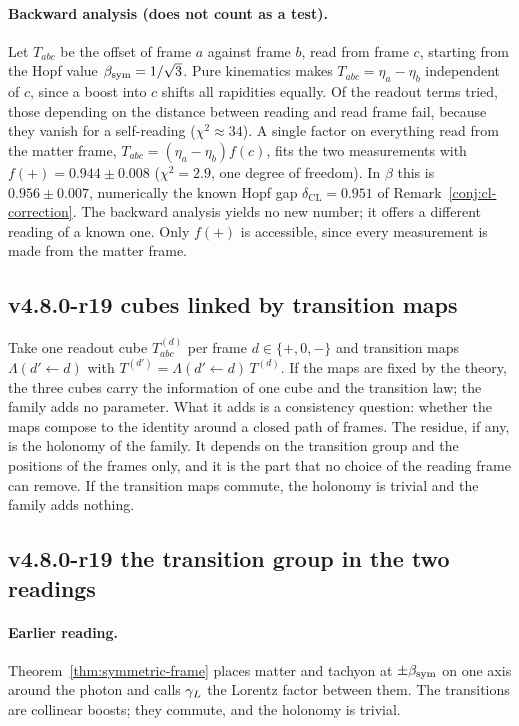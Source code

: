\paragraph{Backward analysis (does not count as a test).}
Let \(T_{abc}\) be the offset of frame \(a\) against frame \(b\), read from frame \(c\), starting from the Hopf value
\(\beta_{\mathrm{sym}}=1/\sqrt3\).  Pure kinematics makes \(T_{abc}=\eta_a-\eta_b\) independent of \(c\), since a boost into \(c\)
shifts all rapidities equally.  Of the readout terms tried, those depending on the distance between reading and read
frame fail, because they vanish for a self-reading (\(\chi^2\approx34\)).  A single factor on everything read from
the matter frame, \(T_{abc}=(\eta_a-\eta_b)f(c)\), fits the two measurements with \(f(+)=0.944\pm0.008\)
(\(\chi^2=2.9\), one degree of freedom).  In \(\beta\) this is \(0.956\pm0.007\), numerically the known Hopf gap
\(\delta_{\mathrm{CL}}=0.951\) of Remark~\ref{conj:cl-correction}.  The backward analysis yields no new number; it
offers a different reading of a known one.  Only \(f(+)\) is accessible, since every measurement is made from the
matter frame.

\subsection*{v4.8.0-r19 cubes linked by transition maps}
\label{subsec:v480-r19-cubes}

Take one readout cube \(T^{(d)}_{abc}\) per frame \(d\in\{+,0,-\}\) and transition maps
\(\Lambda(d'\!\leftarrow\!d)\) with \(T^{(d')}=\Lambda(d'\!\leftarrow\!d)\,T^{(d)}\).  If the maps are fixed by the
theory, the three cubes carry the information of one cube and the transition law; the family adds no parameter.
What it adds is a consistency question: whether the maps compose to the identity around a closed path of frames.  The
residue, if any, is the holonomy of the family.  It depends on the transition group and the positions of the frames
only, and it is the part that no choice of the reading frame can remove.  If the transition maps commute, the
holonomy is trivial and the family adds nothing.

\subsection*{v4.8.0-r19 the transition group in the two readings}
\label{subsec:v480-r19-transition-group}

\paragraph{Earlier reading.}
Theorem~\ref{thm:symmetric-frame} places matter and tachyon at \(\pm\beta_{\mathrm{sym}}\) on one axis around the photon and calls
\(\gamma_L\) the Lorentz factor between them.  The transitions are collinear boosts; they commute, and the holonomy is
trivial.

